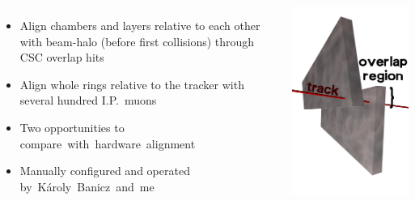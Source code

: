 \documentclass[compress]{beamer}
\begin{document}
\begin{frame}
\vspace{-0.25 cm}
\begin{columns}
\begin{itemize}\setlength{\itemsep}{0.25 cm}
\item Align chambers and layers relative to each other with beam-halo (before
first collisions) through CSC overlap hits
\item Align whole rings relative to the tracker with several hundred I.P.\ muons
\item Two opportunities to compare~with~hardware~alignment~\mbox{\hspace{-10 cm}}
\item Manually configured and operated by~K\'aroly~Banicz~and~me~\mbox{\hspace{-10 cm}}
\end{itemize}
\includegraphics[width=\linewidth]{overlap.png}


\end{columns}
\end{frame}
\end{document}
